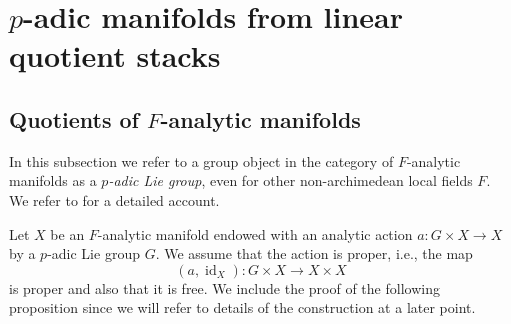 \documentclass{article}
\DeclareMathOperator{\id}{id}
\theoremstyle{definition}
\theoremstyle{plain}
\begin{document}
 











\section{$p$-adic manifolds from linear quotient stacks}\label{mqs}

\subsection{Quotients of $F$-analytic manifolds}

In this subsection we refer to a group object in the category of $F$-analytic manifolds as a \emph{$p$-adic Lie group}, even for other non-archimedean local fields $F$. We refer to \cite{Se09} for a detailed account. 

Let $X$ be an $F$-analytic manifold endowed with an analytic action $a\colon G \times X \to X$ by a $p$-adic Lie group $G$. We assume that the action is proper, i.e., the map
$$(a,\id_X)\colon G \times X \to X \times X$$
is proper and also that it is free. We include the proof of the following proposition since we will refer to details of the construction at a later point.
\end{document}
